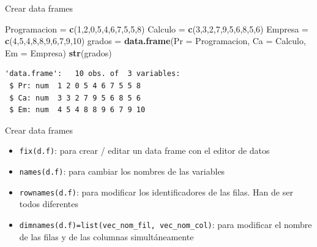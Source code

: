 \documentclass[
  ignorenonframetext,
  aspectratio=169]{beamer}
\newenvironment{Shaded}{\begin{snugshade}}{\end{snugshade}}
\newcommand{\AttributeTok}[1]{\textcolor[rgb]{0.13,0.29,0.53}{#1}}
\newcommand{\DecValTok}[1]{\textcolor[rgb]{0.00,0.00,0.81}{#1}}
\newcommand{\FunctionTok}[1]{\textcolor[rgb]{0.13,0.29,0.53}{\textbf{#1}}}
\newcommand{\NormalTok}[1]{#1}
\newcommand{\OtherTok}[1]{\textcolor[rgb]{0.56,0.35,0.01}{#1}}
\providecommand{\tightlist}{%
  \setlength{\itemsep}{0pt}\setlength{\parskip}{0pt}}
\begin{document}
\begin{frame}[fragile]{Crear data frames}
\label{crear-data-frames-1}
\begin{Shaded}
\begin{Highlighting}[]
\NormalTok{Programacion }\OtherTok{=} \FunctionTok{c}\NormalTok{(}\DecValTok{1}\NormalTok{,}\DecValTok{2}\NormalTok{,}\DecValTok{0}\NormalTok{,}\DecValTok{5}\NormalTok{,}\DecValTok{4}\NormalTok{,}\DecValTok{6}\NormalTok{,}\DecValTok{7}\NormalTok{,}\DecValTok{5}\NormalTok{,}\DecValTok{5}\NormalTok{,}\DecValTok{8}\NormalTok{)}
\NormalTok{Calculo }\OtherTok{=} \FunctionTok{c}\NormalTok{(}\DecValTok{3}\NormalTok{,}\DecValTok{3}\NormalTok{,}\DecValTok{2}\NormalTok{,}\DecValTok{7}\NormalTok{,}\DecValTok{9}\NormalTok{,}\DecValTok{5}\NormalTok{,}\DecValTok{6}\NormalTok{,}\DecValTok{8}\NormalTok{,}\DecValTok{5}\NormalTok{,}\DecValTok{6}\NormalTok{)}
\NormalTok{Empresa }\OtherTok{=} \FunctionTok{c}\NormalTok{(}\DecValTok{4}\NormalTok{,}\DecValTok{5}\NormalTok{,}\DecValTok{4}\NormalTok{,}\DecValTok{8}\NormalTok{,}\DecValTok{8}\NormalTok{,}\DecValTok{9}\NormalTok{,}\DecValTok{6}\NormalTok{,}\DecValTok{7}\NormalTok{,}\DecValTok{9}\NormalTok{,}\DecValTok{10}\NormalTok{)}
\NormalTok{grados }\OtherTok{=} \FunctionTok{data.frame}\NormalTok{(}\AttributeTok{Pr =}\NormalTok{ Programacion, }
                    \AttributeTok{Ca =}\NormalTok{ Calculo, }\AttributeTok{Em =}\NormalTok{ Empresa)}
\FunctionTok{str}\NormalTok{(grados)}
\end{Highlighting}
\end{Shaded}

\begin{verbatim}
'data.frame':   10 obs. of  3 variables:
 $ Pr: num  1 2 0 5 4 6 7 5 5 8
 $ Ca: num  3 3 2 7 9 5 6 8 5 6
 $ Em: num  4 5 4 8 8 9 6 7 9 10
\end{verbatim}
\end{frame}

\begin{frame}[fragile]{Crear data frames}
\label{crear-data-frames-2}
\begin{itemize}
\tightlist
\item
  \texttt{fix(d.f)}: para crear / editar un data frame con el editor de
  datos
\item
  \texttt{names(d.f)}: para cambiar los nombres de las variables
\item
  \texttt{rownames(d.f)}: para modificar los identificadores de las
  filas. Han de ser todos diferentes
\item
  \texttt{dimnames(d.f)=list(vec\_nom\_fil,\ vec\_nom\_col)}: para
  modificar el nombre de las filas y de las columnas simultáneamente
\end{itemize}
\end{frame}
\end{document}
